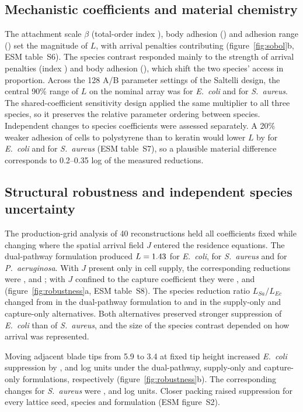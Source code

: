 \documentclass[11pt]{article}
\newcommand{\Ec}{\textit{E.~coli}}
\newcommand{\Sa}{\textit{S.~aureus}}
\newcommand{\Pa}{\textit{P.~aeruginosa}}
\begin{document}
\subsection{Mechanistic coefficients and material chemistry}
The attachment scale $\beta$ (total-order index \SMBeta{}), body adhesion (\SMAdh{}) and adhesion range (\SMRng{}) set the magnitude of $L$, with arrival penalties contributing \SMTrp{} (figure~\ref{fig:sobol}b, ESM table~S6). The species contrast responded mainly to the strength of arrival penalties (index \SMcTrp{}) and body adhesion (\SMcAdh{}), which shift the two species' access in proportion. Across the 128 A/B parameter settings of the Saltelli design, the central 90\% range of $L$ on the nominal array was \PPsnakeEc{} for \Ec{} and \PPsnakeSa{} for \Sa{}. The shared-coefficient sensitivity design applied the same multiplier to all three species, so it preserves the relative parameter ordering between species. Independent changes to species coefficients were assessed separately. A 20\% weaker adhesion of cells to polystyrene than to keratin would lower $L$ by \ChemLowEc{} for \Ec{} and \ChemLowSa{} for \Sa{} (ESM table~S7), so a plausible material difference corresponds to 0.2--0.35 log of the measured reductions.

\subsection{Structural robustness and independent species uncertainty}
The production-grid analysis of 40 reconstructions held all coefficients fixed while changing where the spatial arrival field $J$ entered the residence equations. The dual-pathway formulation produced $L=1.43{}$ for \Ec{}, \ArrDualSa{} for \Sa{} and \ArrDualPa{} for \Pa{}. With $J$ present only in cell supply, the corresponding reductions were \ArrSupplyEc{}, \ArrSupplySa{} and \ArrSupplyPa{}; with $J$ confined to the capture coefficient they were \ArrCaptureEc{}, \ArrCaptureSa{} and \ArrCapturePa{} (figure~\ref{fig:robustness}a, ESM table~S8). The species reduction ratio $L_{Sa}/L_{Ec}$ changed from \ArrDualRatio{} in the dual-pathway formulation to \ArrSupplyRatio{} and \ArrCaptureRatio{} in the supply-only and capture-only alternatives. Both alternatives preserved stronger suppression of \Ec{} than of \Sa{}, and the size of the species contrast depended on how arrival was represented.

Moving adjacent blade tips from 5.9 to \SI{3.4}{\micrometre} at fixed tip height increased \Ec{} suppression by \SpcDualEc{}, \SpcSupplyEc{} and \SpcCaptureEc{} log units under the dual-pathway, supply-only and capture-only formulations, respectively (figure~\ref{fig:robustness}b). The corresponding changes for \Sa{} were \SpcDualSa{}, \SpcSupplySa{} and \SpcCaptureSa{} log units. Closer packing raised suppression for every lattice seed, species and formulation (ESM figure~S2).
\end{document}
